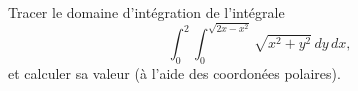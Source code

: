 \begin{exercice}\label{exoGeomAnal-0036}

Tracer le domaine d'intégration de l'intégrale
\[
\int_0^2\int_0^{\sqrt{2x-x^2}} \sqrt{x^2+y^2}\, dy\,dx,
\]
et calculer sa valeur (à l'aide des coordonées polaires). 

\end{exercice}
